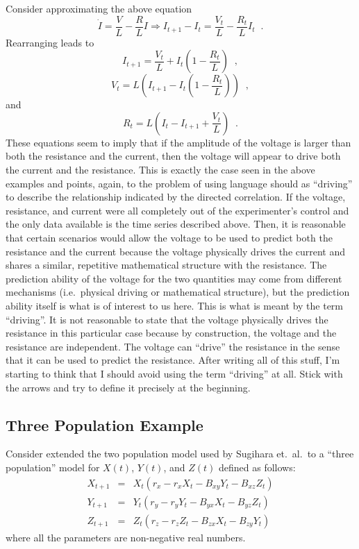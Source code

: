 \documentclass[a4paper,11pt]{article}
\begin{document}
Consider approximating the above equation
$$
\dot{I} = \frac{V}{L} - \frac{R}{L} I\Rightarrow I_{t+1}-I_t = \frac{V_t}{L} - \frac{R_t}{L} I_t\;\;.
$$
Rearranging leads to
$$
I_{t+1} = \frac{V_t}{L}+I_t\left(1-\frac{R_t}{L}\right)\;\;,
$$
$$
V_t = L\left(I_{t+1}-I_t\left(1-\frac{R_t}{L}\right)\right)\;\;,
$$
and
$$
R_t = L\left(I_t-I_{t+1}+\frac{V_t}{L}\right)\;\;.
$$
These equations seem to imply that if the amplitude of the voltage is larger than both the resistance and the current, then the voltage will appear to drive both the current and the resistance.  This is exactly the case seen in the above examples and points, again, to the problem of using language should as ``driving'' to describe the relationship indicated by the directed correlation.  If the voltage, resistance, and current were all completely out of the experimenter's control and the only data available is the time series described above.  Then, it is reasonable that certain scenarios would allow the voltage to be used to predict both the resistance and the current because the voltage physically drives the current and shares a similar, repetitive mathematical structure with the resistance.  The prediction ability of the voltage for the two quantities may come from different mechanisms (i.e.\ physical driving or mathematical structure), but the prediction ability itself is what is of interest to us here.  This is what is meant by the term ``driving''.  It is not reasonable to state that the voltage physically drives the resistance in this particular case because by construction, the voltage and the resistance are independent.  The voltage can ``drive'' the resistance in the sense that it can be used to predict the resistance.  After writing all of this stuff, I'm starting to think that I should avoid using the term ``driving'' at all.  Stick with the arrows and try to define it precisely at the beginning.

\subsection{Three Population Example}
Consider extended the two population model used by Sugihara et.\ al.\ to a ``three population'' model for $X(t)$, $Y(t)$, and $Z(t)$ defined as follows:
\begin{eqnarray*}
X_{t+1} &=& X_t\left(r_x-r_x X_t-B_{xy} Y_t-B_{xz} Z_t\right)\\
Y_{t+1} &=& Y_t\left(r_y-r_y Y_t-B_{yx} X_t-B_{yz} Z_t\right)\\
Z_{t+1} &=& Z_t\left(r_z-r_z Z_t-B_{zx} X_t-B_{zy} Y_t\right)
\end{eqnarray*}
where all the parameters are non-negative real numbers.
\end{document}
